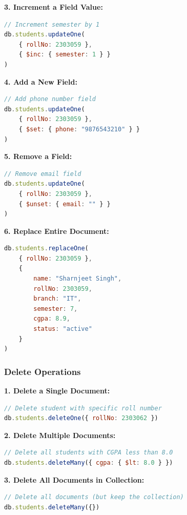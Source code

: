 \documentclass[12pt,a4paper]{article}
\begin{document}
\textbf{3. Increment a Field Value:}

\begin{lstlisting}[language=JavaScript]
// Increment semester by 1
db.students.updateOne(
    { rollNo: 2303059 },
    { $inc: { semester: 1 } }
)
\end{lstlisting}

\textbf{4. Add a New Field:}

\begin{lstlisting}[language=JavaScript]
// Add phone number field
db.students.updateOne(
    { rollNo: 2303059 },
    { $set: { phone: "9876543210" } }
)
\end{lstlisting}

\textbf{5. Remove a Field:}

\begin{lstlisting}[language=JavaScript]
// Remove email field
db.students.updateOne(
    { rollNo: 2303059 },
    { $unset: { email: "" } }
)
\end{lstlisting}

\textbf{6. Replace Entire Document:}

\begin{lstlisting}[language=JavaScript]
db.students.replaceOne(
    { rollNo: 2303059 },
    {
        name: "Sharnjeet Singh",
        rollNo: 2303059,
        branch: "IT",
        semester: 7,
        cgpa: 8.9,
        status: "active"
    }
)
\end{lstlisting}

\subsubsection{Delete Operations}

\textbf{1. Delete a Single Document:}

\begin{lstlisting}[language=JavaScript]
// Delete student with specific roll number
db.students.deleteOne({ rollNo: 2303062 })
\end{lstlisting}

\textbf{2. Delete Multiple Documents:}

\begin{lstlisting}[language=JavaScript]
// Delete all students with CGPA less than 8.0
db.students.deleteMany({ cgpa: { $lt: 8.0 } })
\end{lstlisting}

\textbf{3. Delete All Documents in Collection:}

\begin{lstlisting}[language=JavaScript]
// Delete all documents (but keep the collection)
db.students.deleteMany({})
\end{lstlisting}
\end{document}
